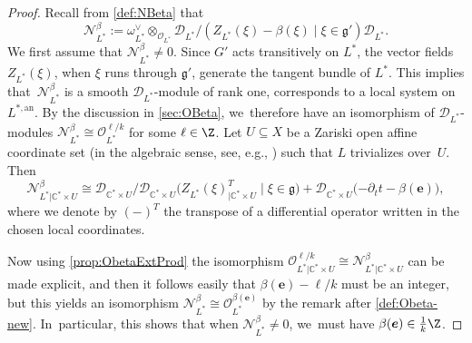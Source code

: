 \documentclass[JEP,XML,SOM,Unicode,published]{cedram}
\let\mathds\mathbb
\newcommand{\bme}{{\boldsymbol{e}}}
\newcommand{\dC}{{\mathds C}}\let\C\dC
\newcommand{\cD}{\mathscr{D}}
\newcommand{\cO}{\mathcal{O}}\let\O\cO
\newcommand{\frg}{\mathfrak{g}}
\begin{document}
\begin{proof}
Recall from \cref{def:NBeta} that
\[
\mathscr N_{L^*}^\beta := \omega_{L^*}^\vee \otimes_{\O_{L^*}} \mathscr{D}_{L^*}/(Z_{L^*}(\xi)-\beta(\xi) \mid \xi \in \frg')\mathscr{D}_{L^*}.
\]
We first assume that $\mathscr N_{L^*}^\beta \neq 0$. Since $G'$ acts transitively on $L^*$, the vector fields $Z_{L^*}(\xi)$, when $\xi$ runs through $\frg'$, generate the tangent bundle of $L^*$. This implies that~$\mathscr N_{L^*}^\beta$ is a smooth $\mathscr{D}_{L^*}$\nobreakdash-mod\-ule of rank one, \ie corresponds to a local system on~$L^{*,\mathrm{an}}$.
By the discussion in \cref{sec:OBeta}, we~therefore have an isomorphism of $\cD_{L^*}$\nobreakdash-mod\-ules
$\mathscr N_{L^*}^\beta\cong \cO_{L^*}^{\ell/k}$ for some $\ell\in\Z$. Let $U\subseteq X$ be a Zariski open affine coordinate set (in the algebraic sense, see, e.g., \cite[Def.\,A.5.2]{Hotta}) such that $L$ trivializes over~$U$. Then
\[
\mathscr N_{L^*|\dC^*\times U}^\beta \cong
\cD_{\dC^*\times U}/\cD_{\dC^*\times U}\bigl(Z_{L^*}(\xi)_{|\dC^*\times U}^T\mid \xi\in\frg)+
\cD_{\dC^*\times U}(-\partial_t t -\beta(\bme)\bigr),
\]
where we denote by $(-)^T$ the transpose of a differential operator written in the chosen local coordinates.

Now using \cref{prop:ObetaExtProd} the isomorphism $\cO_{L^*|\dC^*\times U}^{\ell/k}\cong \mathscr N_{L^*|\dC^*\times U}^\beta$ can be made explicit, and then it follows easily that $\beta(\bme)-\ell/k$ must be an integer, but this yields an isomorphism $ \mathscr N_{L^*}^\beta \cong \cO_{L^*}^{\beta(\bme)}$ by the remark after \cref{def:Obeta-new}. In~particular, this shows that when $\mathscr N_{L^*}^\beta\neq 0$, we~must have $\beta(\bme)\in\frac{1}{k}\Z$.


\end{proof}
\end{document}
